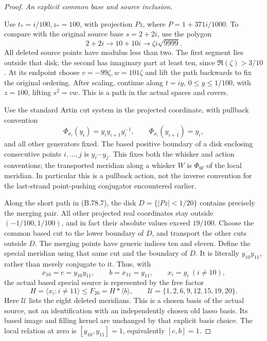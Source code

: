 \begin{proof}
\emph{An explicit common base and source inclusion.}\par
Use \(t_*=i/100,z_*=100\), with projection \(Pz\), where
\(P=1+371i/1000\). To compare with the original source base \(s=2+2i\),
use the polygon
\[
        2+2i\longrightarrow10+10i
                 \longrightarrow\zeta i\sqrt{9999}.
 \tag{B.78.7}
\]
All deleted source points have modulus less than two. The first segment
lies outside that disk; the second has imaginary part at least ten,
since \(\Re(\zeta)>3/10\). At its endpoint choose
\(v=-99\zeta,w=101\zeta\) and lift the path backwards to fix the
original ordering. After scaling, continue along \(t=iy\),
\(0\leq y\leq1/100\), with \(z=100\), lifting \(s^2=vw\).
This is a path in the actual spaces and covers.

Use the standard Artin cut system in the projected coordinate, with
pullback convention
\[
 \Phi_{\sigma_i}(y_i)=y_i y_{i+1}y_i^{-1},\qquad
 \Phi_{\sigma_i}(y_{i+1})=y_i,
 \tag{B.78.8}
\]
and all other generators fixed. The based positive boundary of a disk
enclosing consecutive points \(i,\ldots,j\) is
\(y_i\cdots y_j\). This fixes both the whisker and action conventions;
the transported meridian along a whisker \(W\) is
\(\Phi_W\) of the local meridian. In particular this is a pullback
action, not the inverse convention for the last-strand point-pushing
conjugator encountered earlier.

Along the short path in (B.78.7), the disk \(D=\{|Pz|<1/20\}\)
contains precisely the merging pair. All other projected real
coordinates stay outside \((-1/100,1/100)\), and in fact their
absolute values exceed \(19/100\). Choose the common based cut to the
lower boundary of \(D\), and transport the other cuts outside \(D\).
The merging points have generic indices ten and eleven. Define the
special meridian using that same cut and the boundary of \(D\).
It is literally \(y_{10}y_{11}\), rather than merely conjugate to it.
Thus, with
\[
 x_{10}=c=y_{10}y_{11},\qquad b=x_{11}=y_{11},\qquad
 x_i=y_i\ (i\ne10),
 \tag{B.78.9}
\]
the actual based special source is represented by the free factor
\[
 H=\langle x_i:i\ne11\rangle\leq F_{20}=H*\langle b\rangle,
 \qquad \mathcal U=\{1,2,6,9,12,15,19,20\}.
 \tag{B.78.10}
\]
Here \(\mathcal U\) lists the eight deleted meridians. This is a chosen
basis of the actual source, not an identification with an independently
chosen old lasso basis. Its based image and filling kernel are unchanged
by that explicit basis choice. The local relation at zero is
\([y_{10},y_{11}]=1\), equivalently \([c,b]=1\).


\end{proof}
